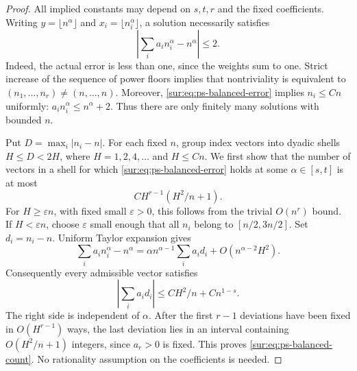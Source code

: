 \documentclass[11pt,a4paper]{article}
\theoremstyle{definition}
\theoremstyle{remark}
\numberwithin{equation}{section}
\begin{document}
\begin{proof}
All implied constants may depend on $s,t,r$ and the fixed coefficients.
Writing $y=\lfloor n^\alpha\rfloor$ and
$x_i=\lfloor n_i^\alpha\rfloor$, a solution necessarily satisfies
\begin{equation}\label{sur:eq:ps-balanced-error}
 \left|\sum_i a_i n_i^\alpha-n^\alpha\right|\le2.
\end{equation}
Indeed, the actual error is less than one, since the weights sum to
one. Strict increase of the sequence of power floors implies that
nontriviality is equivalent to $(n_1,\ldots,n_r)\ne(n,\ldots,n)$.
Moreover, \eqref{sur:eq:ps-balanced-error} implies $n_i\le Cn$ uniformly:
$a_i n_i^\alpha\le n^\alpha+2$. Thus there are only finitely many
solutions with bounded $n$.

Put $D=\max_i|n_i-n|$. For each fixed $n$, group index vectors into
dyadic shells $H\le D<2H$, where $H=1,2,4,\ldots$ and $H\le Cn$.
We first show that the number of vectors in a shell for which
\eqref{sur:eq:ps-balanced-error} holds at some $\alpha\in[s,t]$ is at most
\begin{equation}\label{sur:eq:ps-balanced-count}
 C H^{r-1}(H^2/n+1).
\end{equation}
For $H\ge\varepsilon n$, with fixed small $\varepsilon>0$, this follows
from the trivial $O(n^r)$ bound. If $H<\varepsilon n$, choose
$\varepsilon$ small enough that all $n_i$ belong to $[n/2,3n/2]$.
Set $d_i=n_i-n$. Uniform Taylor expansion gives
\[
 \sum_i a_i n_i^\alpha-n^\alpha
 =\alpha n^{\alpha-1}\sum_i a_i d_i
   +O(n^{\alpha-2}H^2).
\]
Consequently every admissible vector satisfies
\begin{equation}\label{sur:eq:ps-balanced-slab}
 \left|\sum_i a_i d_i\right|\le C H^2/n+C n^{1-s}.
\end{equation}
The right side is independent of $\alpha$. After the first $r-1$
deviations have been fixed in $O(H^{r-1})$ ways, the last deviation
lies in an interval containing $O(H^2/n+1)$ integers, since $a_r>0$
is fixed. This proves \eqref{sur:eq:ps-balanced-count}. No rationality
assumption on the coefficients is needed.


\end{proof}
\end{document}
